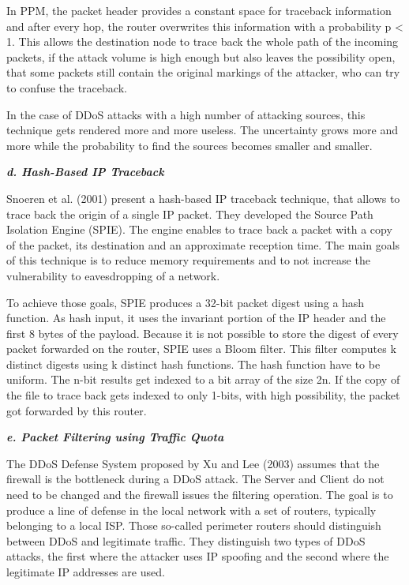 In PPM, the packet header provides a constant space for traceback information and after every hop, the router overwrites this information with a probability p < 1. This allows the destination node to trace back the whole path of the incoming packets, if the attack volume is high enough but also leaves the possibility open, that some packets still contain the original markings of the attacker, who can try to confuse the traceback. \cite{Park01}

In the case of DDoS attacks with a high number of attacking sources, this technique gets rendered more and more useless. The uncertainty grows more and more while the probability to find the sources becomes smaller and smaller. \cite{Park01}

\textbf{\textit{d. Hash-Based IP Traceback}}

Snoeren et al. (2001) present a hash-based IP traceback technique, that allows to trace back the origin of a single IP packet. They developed the Source Path Isolation Engine (SPIE). The engine enables to trace back a packet with a copy of the packet, its destination and an approximate reception time. The main goals of this technique is to reduce memory requirements and to not increase the vulnerability to eavesdropping of a network. \cite{Snoeren01}

To achieve those goals, SPIE produces a 32-bit packet digest using a hash function. As hash input, it uses the invariant portion of the IP header and the first 8 bytes of the payload. Because it is not possible to store the digest of every packet forwarded on the router, SPIE uses a Bloom filter. This filter computes k distinct digests using k distinct hash functions. The hash function have to be uniform. The n-bit results get indexed to a bit array of the size 2n. If the copy of the file to trace back gets indexed to only 1-bits, with high possibility, the packet got forwarded by this router. \cite{Snoeren01}

\textbf{\textit{e. Packet Filtering using Traffic Quota}}

The DDoS Defense System proposed by Xu and Lee (2003) assumes that the firewall is the bottleneck during a DDoS attack. The Server and Client do not need to be changed and the firewall issues the filtering operation. The goal is to produce a line of defense in the local network with a set of routers, typically belonging to a local ISP. Those so-called perimeter routers should distinguish between DDoS and legitimate traffic. They distinguish two types of DDoS attacks, the first where the attacker uses IP spoofing and the second where the legitimate IP addresses are used. \cite{Xu03}

